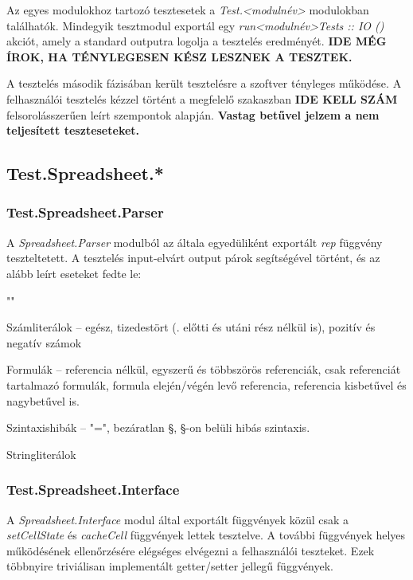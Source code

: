 Az egyes modulokhoz tartozó tesztesetek a \textit{Test.<modulnév>} modulokban találhatók. Mindegyik tesztmodul exportál egy \textit{run<modulnév>Tests :: IO ()} akciót, amely a standard outputra logolja a tesztelés eredményét. \textbf{IDE MÉG ÍROK, HA TÉNYLEGESEN KÉSZ LESZNEK A TESZTEK.}

A tesztelés második fázisában került tesztelésre a szoftver tényleges működése. A felhasználói tesztelés kézzel történt a megfelelő szakaszban \textbf{IDE KELL SZÁM} felsorolásszerűen leírt szempontok alapján. \textbf{Vastag betűvel jelzem a nem teljesített teszteseteket.}

\subsection{Test.Spreadsheet.*}

\subsubsection{Test.Spreadsheet.Parser}

A \textit{Spreadsheet.Parser} modulból az általa egyedüliként exportált \textit{rep} függvény teszteltetett. A tesztelés input-elvárt output párok segítségével történt, és az alább leírt eseteket fedte le:

\begin{compactenum}
	\item ""
	\item Számliterálok -- egész, tizedestört (. előtti és utáni rész nélkül is), pozitív és negatív számok
	\item Formulák -- referencia nélkül, egyszerű és többszörös referenciák, csak referenciát tartalmazó formulák, formula elején/végén levő referencia, referencia kisbetűvel és nagybetűvel is.
	\item Szintaxishibák -- "=", bezáratlan §, §-on belüli hibás szintaxis.
	\item Stringliterálok
\end{compactenum}

\subsubsection{Test.Spreadsheet.Interface}

A \textit{Spreadsheet.Interface} modul által exportált függvények közül
csak a \textit{setCellState} és \textit{cacheCell} függvények lettek tesztelve. A további függvények helyes működésének ellenőrzésére elégséges elvégezni a felhasználói teszteket. Ezek többnyire triviálisan implementált getter/setter jellegű függvények.

